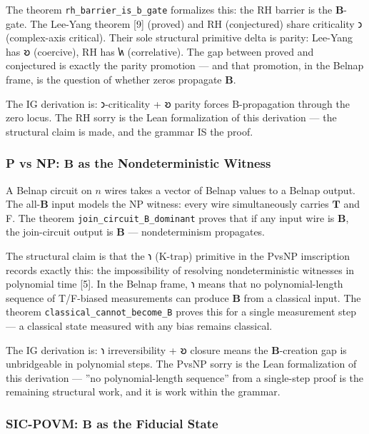 \documentclass[10pt,a4paper]{article}
\begin{document}
The theorem \texttt{rh\_\allowbreak barrier\_\allowbreak is\_\allowbreak b\_\allowbreak gate} formalizes this: the RH barrier is the $\mathbf{B}$-gate. The Lee-Yang theorem {[}9{]} (proved) and RH (conjectured) share criticality 𐑮 (complex-axis critical). Their sole structural primitive delta is parity: Lee-Yang has 𐑹 (coercive), RH has 𐑿 (correlative). The gap between proved and conjectured is exactly the parity promotion --- and that promotion, in the Belnap frame, is the question of whether zeros propagate $\mathbf{B}$.

The IG derivation is: 𐑮-criticality + 𐑹 parity forces B-propagation through the zero locus. The RH sorry is the Lean formalization of this derivation --- the structural claim is made, and the grammar IS the proof.

\subsubsection{P vs NP: $\mathbf{B}$ as the Nondeterministic Witness}

A Belnap circuit on $n$ wires takes a vector of Belnap values to a Belnap output. The all-$\mathbf{B}$ input models the NP witness: every wire simultaneously carries $\mathbf{T}$ and F. The theorem \texttt{join\_\allowbreak circuit\_\allowbreak B\_\allowbreak dominant} proves that if any input wire is $\mathbf{B}$, the join-circuit output is $\mathbf{B}$ --- nondeterminism propagates.

The structural claim is that the 𐑪 (K-trap) primitive in the PvsNP imscription records exactly this: the impossibility of resolving nondeterministic witnesses in polynomial time {[}5{]}. In the Belnap frame, 𐑪 means that no polynomial-length sequence of T/F-biased measurements can produce $\mathbf{B}$ from a classical input. The theorem \texttt{classical\_\allowbreak cannot\_\allowbreak become\_\allowbreak B} proves this for a single measurement step --- a classical state measured with any bias remains classical.

The IG derivation is: 𐑪 irreversibility + 𐑹 closure means the $\mathbf{B}$-creation gap is unbridgeable in polynomial steps. The PvsNP sorry is the Lean formalization of this derivation --- ''no polynomial-length sequence'' from a single-step proof is the remaining structural work, and it is work within the grammar.

\subsubsection{SIC-POVM: $\mathbf{B}$ as the Fiducial State}
\end{document}
